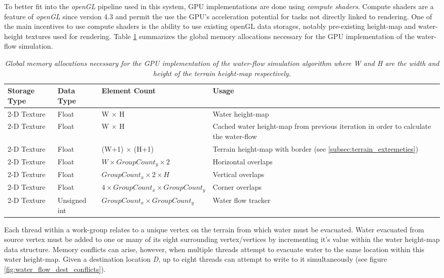 To better fit into the \textit{openGL} pipeline used in this system, GPU implementations are done using \textit{compute shaders}. Compute shaders are a feature of \textit{openGL} since version 4.3 and permit the use the GPU's acceleration potential for tasks not directly linked to rendering. One of the main incentives to use compute shaders is the ability to use existing openGL data storages, notably pre-existing height-map and water-height textures used for rendering. Table \ref{tab:water_flow_simul_mem_allocs} summarizes the global memory allocations necessary for the GPU implementation of the water-flow simulation.\\

\begin{table}[]
  \centering
	    \begin{tabular}{|p{3cm}|p{1.5cm}|p{6cm}|p{5cm}|}
		\hline	
  	    \textbf{Storage Type} &  \textbf{Data Type} & \textbf{Element Count} & \textbf{Usage} \\
		\hline
		2-D Texture & Float & W $\times$ H & Water height-map\\
		\hline
		2-D Texture & Float & W $\times$ H & Cached water height-map from previous iteration in order to calculate the water-flow\\
		\hline
		2-D Texture & Float & (W+1) $\times$ (H+1) & Terrain height-map with border (see \ref{subsec:terrain_extremeties}) \\
		\hline
		2-D Texture & Float & $ W \times GroupCount_{y} \times 2 $ & Horizontal overlaps  \\
		\hline
		2-D Texture & Float & $ GroupCount_{x} \times 2 \times H $ & Vertical overlaps  \\
		\hline
		2-D Texture & Float & $ 4 \times GroupCount_{x} \times GroupCount_{y}$ & Corner overlaps  \\
		\hline
		2-D Texture & Unsigned int & $ GroupCount_{x} \times GroupCount_{y}$ & Water flow tracker \\
		\hline
		\end{tabular}
		\caption{\textit{Global memory allocations necessary for the GPU implementation of the water-flow simulation algorithm where \textit{W} and \textit{H} are the width and height of the terrain height-map respectively.}}
	  \label{tab:water_flow_simul_mem_allocs}
\end{table}

Each thread within a work-group relates to a unique vertex on the terrain from which water must be evacuated. Water evacuated from source vertex must be added to one or many of its eight surrounding vertex/vertices by incrementing it's value within the water height-map data structure. Memory conflicts can arise, however, when multiple threads attempt to evacuate water to the same location within this water height-map. Given a destination location \textit{D}, up to eight threads can attempt to write to it simultaneously (see figure \ref{fig:water_flow_dest_conflicts}).\\ 

